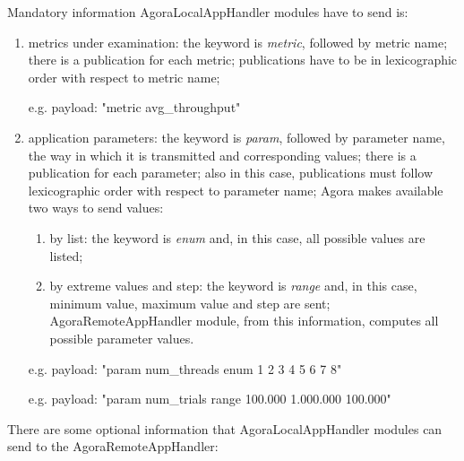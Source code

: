 Mandatory information AgoraLocalAppHandler modules have to send is:

\begin{enumerate}

    \item metrics under examination: the keyword is \textit{metric}, followed by metric name; there is a publication for each metric; publications have to be in lexicographic order with respect to metric name;
    
    e.g. payload: "metric avg\_throughput"
    
    \item application parameters: the keyword is \textit{param}, followed by parameter name, the way in which it is transmitted and corresponding values; there is a publication for each parameter; also in this case, publications must follow lexicographic order with respect to parameter name; Agora makes available two ways to send values:
    
    \begin{enumerate}
    
        \item by list: the keyword is \textit{enum} and, in this case, all possible values are listed;
        
        \item by extreme values and step: the keyword is \textit{range} and, in this case, minimum value, maximum value and step are sent; AgoraRemoteAppHandler module, from this information, computes all possible parameter values.
    
    \end{enumerate}
    
    e.g. payload: "param num\_threads enum 1 2 3 4 5 6 7 8"
    
    e.g. payload: "param num\_trials range 100.000 1.000.000 100.000"

\end{enumerate}

There are some optional information that AgoraLocalAppHandler modules can send to the AgoraRemoteAppHandler:

